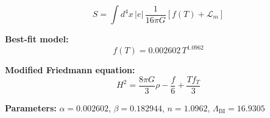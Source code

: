 
\begin{equation}
  S = \int d^4x \, |e| \, \frac{1}{16\pi G} \left[ f(T) + \mathcal{L}_m \right]
\end{equation}

\textbf{Best-fit model:}
\begin{equation}
  f(T) = 0.002602 \, T^{1.0962}
\end{equation}

\textbf{Modified Friedmann equation:}
\begin{equation}
  H^2 = \frac{8\pi G}{3} \rho - \frac{f}{6} + \frac{T f_T}{3}
\end{equation}

\textbf{Parameters:}
$\alpha = 0.002602$, \quad
$\beta = 0.182944$, \quad
$n = 1.0962$, \quad
$\Lambda_{\text{BI}} = 16.9305$